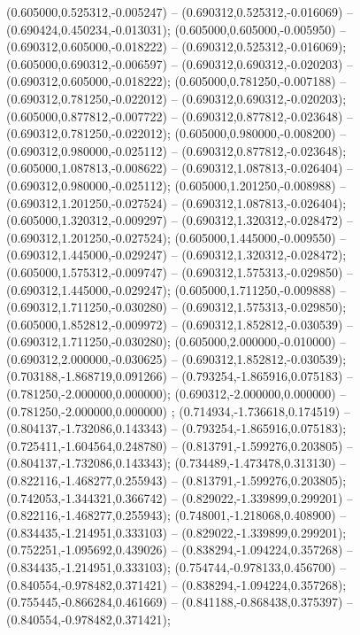  (0.605000,0.525312,-0.005247) -- (0.690312,0.525312,-0.016069) -- (0.690424,0.450234,-0.013031);
 (0.605000,0.605000,-0.005950) -- (0.690312,0.605000,-0.018222) -- (0.690312,0.525312,-0.016069);
 (0.605000,0.690312,-0.006597) -- (0.690312,0.690312,-0.020203) -- (0.690312,0.605000,-0.018222);
 (0.605000,0.781250,-0.007188) -- (0.690312,0.781250,-0.022012) -- (0.690312,0.690312,-0.020203);
 (0.605000,0.877812,-0.007722) -- (0.690312,0.877812,-0.023648) -- (0.690312,0.781250,-0.022012);
 (0.605000,0.980000,-0.008200) -- (0.690312,0.980000,-0.025112) -- (0.690312,0.877812,-0.023648);
 (0.605000,1.087813,-0.008622) -- (0.690312,1.087813,-0.026404) -- (0.690312,0.980000,-0.025112);
 (0.605000,1.201250,-0.008988) -- (0.690312,1.201250,-0.027524) -- (0.690312,1.087813,-0.026404);
 (0.605000,1.320312,-0.009297) -- (0.690312,1.320312,-0.028472) -- (0.690312,1.201250,-0.027524);
 (0.605000,1.445000,-0.009550) -- (0.690312,1.445000,-0.029247) -- (0.690312,1.320312,-0.028472);
 (0.605000,1.575312,-0.009747) -- (0.690312,1.575313,-0.029850) -- (0.690312,1.445000,-0.029247);
 (0.605000,1.711250,-0.009888) -- (0.690312,1.711250,-0.030280) -- (0.690312,1.575313,-0.029850);
 (0.605000,1.852812,-0.009972) -- (0.690312,1.852812,-0.030539) -- (0.690312,1.711250,-0.030280);
 (0.605000,2.000000,-0.010000) -- (0.690312,2.000000,-0.030625) -- (0.690312,1.852812,-0.030539);
 (0.703188,-1.868719,0.091266) -- (0.793254,-1.865916,0.075183) -- (0.781250,-2.000000,0.000000);
 (0.690312,-2.000000,0.000000) -- (0.781250,-2.000000,0.000000) ;
 (0.714934,-1.736618,0.174519) -- (0.804137,-1.732086,0.143343) -- (0.793254,-1.865916,0.075183);
 (0.725411,-1.604564,0.248780) -- (0.813791,-1.599276,0.203805) -- (0.804137,-1.732086,0.143343);
 (0.734489,-1.473478,0.313130) -- (0.822116,-1.468277,0.255943) -- (0.813791,-1.599276,0.203805);
 (0.742053,-1.344321,0.366742) -- (0.829022,-1.339899,0.299201) -- (0.822116,-1.468277,0.255943);
 (0.748001,-1.218068,0.408900) -- (0.834435,-1.214951,0.333103) -- (0.829022,-1.339899,0.299201);
 (0.752251,-1.095692,0.439026) -- (0.838294,-1.094224,0.357268) -- (0.834435,-1.214951,0.333103);
 (0.754744,-0.978133,0.456700) -- (0.840554,-0.978482,0.371421) -- (0.838294,-1.094224,0.357268);
 (0.755445,-0.866284,0.461669) -- (0.841188,-0.868438,0.375397) -- (0.840554,-0.978482,0.371421);
